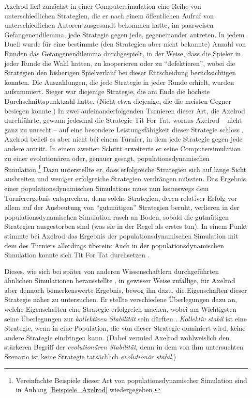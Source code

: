 \documentclass[12pt,a4paper,ngerman]{article}
\begin{document}
Axelrod ließ zunächst in einer Computersimulation eine Reihe von
unterschiedlichen Strategien, die er nach einem öffentlichen Aufruf
von unterschiedlichen Autoren zusgesandt bekommen hatte, im paarweisen
Gefangenendilemma, jede Strategie gegen jede, gegeneinander antreten.
In jedem Duell wurde für eine bestimmte (den Strategien aber nicht
bekannte) Anzahl von Runden das Gefangenendilemma durchgespielt, in
der Weise, dass die Spieler in jeder Runde die Wahl hatten, zu
kooperieren oder zu "`defektieren"', wobei die Strategien den
bisherigen Spielverlauf bei dieser Entscheidung berücksichtigen
konnten.  Die Auszahlungen, die jede Strategie in jeder Runde erhielt,
wurden aufsummiert. Sieger war diejenige Strategie, die am Ende die
höchste Durchschnittspunktzahl hatte. (Nicht etwa diejenige, die die
meisten Gegner besiegen konnte.)  In zwei aufeinanderfolgenden
Turnieren dieser Art, die Axelrod durchführte, gewann jedesmal die
Strategie Tit For Tat, woraus Axelrod -- nicht ganz zu unrecht -- auf
eine besondere Leistungsfähigkeit dieser Strategie schloss \cite[S.
25ff.]{axelrod:1984}.  Axelrod beließ es aber nicht bei einem Turnier,
in dem jede Strategie gegen jede andere antritt. In einem zweiten
Schritt erweiterte er seine Computersimulation zu einer evolutionären
oder, genauer gesagt, populationsdynamischen
Simulation.\footnote{Vereinfachte Beispiele dieser Art von
  populationsdynamischer Simulation sind in Anhang
  \ref{Beispiele_Axelrod} wiedergegeben.} Dazu unterstellte er, dass
erfolgreiche Strategien sich auf lange Sicht ausbreiten und weniger
erfolgreiche Strategien verdrängen müssten. Das Ergebnis einer
populationsdynamischen Simulations muss nun keineswegs dem
Turnierergebnis entsprechen, denn solche Strategien, deren relativer
Erfolg vor allem auf der Ausbeutung von "`gutmütigen"' Strategien
beruht, verlieren in der populationsdynamischen Simulation rasch an
Boden, sobald die gutmütigen Strategien ausgestorben sind (was sie in
der Regel als erstes tun). In einem Punkt stimmte bei Axelrod das
Ergebnis der populationsdynamischen Simulation mit dem des Turniers
allerdings überein: Auch in der populationsdynamischen Simulation
konnte sich Tit For Tat durchsetzen \cite[S. 43ff.]{axelrod:1984}.

Dieses, wie sich bei später von anderen Wissenschaftlern
durchgeführten ähnlichen Simulationen herausstellte
\cite[S. 194ff.]{binmore:1994}, in gewisser Weise zufällige, für
Axelrod aber dennoch bemerkenswerte Ergebnis, bewog ihn dazu, die
Eigenschaften dieser Strategie näher zu untersuchen. Er stellte
verschiedene Überlegungen dazu an, welche Eigenschaften eine Strategie
erfolgreich machen, wobei am Wichtigsten seine Überlegungen zur {\em
kollektiven Stabilität} sein dürften
\cite[S. 50ff.]{axelrod:1984}. {\em Kollektiv stabil} ist eine
Strategie, wenn in eine Population, die von dieser Strategie dominiert
wird, keine andere Strategie eindringen kann. (Dabei vermied Axelrod
wohlweislich den stärkeren Begriff der {\em evolutionären Stabilität},
denn in dem von ihm untersuchten Szenario ist keine Strategie
tatsächlich {\em evolutionär stabil}.)
\end{document}
